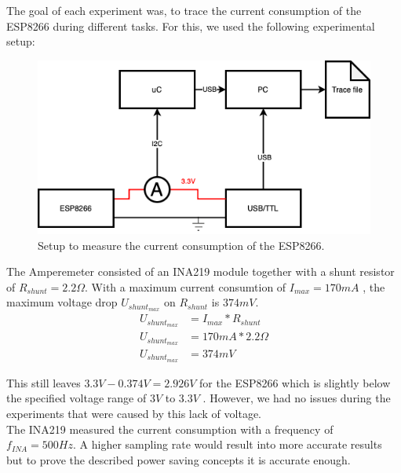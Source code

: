 The goal of each experiment was, to trace the current consumption of the ESP8266 during different tasks.
For this, we used the following experimental setup:

\begin{figure}[h]
    \centering
    \includegraphics[width = \linewidth]{fig/experimental_setup.png}
    \caption{Setup to measure the current consumption of the ESP8266.}
    \label{fig:experiment_setup}
\end{figure}

The Amperemeter consisted of an INA219 module together with a shunt resistor of $R_{shunt} = 2.2 \Omega$.
With a maximum current consumtion of $I_{max}=170 mA$ \cite{espressif_inc_esp8266_2016}, the maximum voltage drop $U_{shunt_{max}}$ on $R_{shunt}$ is $374mV$.
\begin{align*}
    U_{shunt_{max}} &= I_{max} * R_{shunt}\\
    U_{shunt_{max}} &= 170mA * 2.2 \Omega\\
    U_{shunt_{max}} &= 374mV
\end{align*}

This still leaves $3.3V - 0.374V = 2.926V$ for the ESP8266 which is slightly below the specified voltage range of $3V$ to $3.3V$ \cite{espressif_inc_esp8266_2016}.
However, we had no issues during the experiments that were caused by this lack of voltage.\\
The INA219 measured the current consumption with a frequency of $f_{INA} = 500Hz$.
A higher sampling rate would result into more accurate results but to prove the described power saving concepts it is accurate enough.

